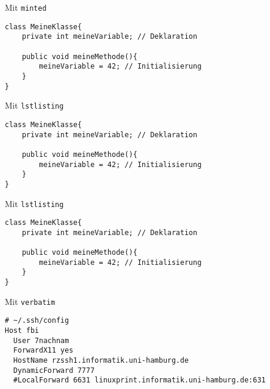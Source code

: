 \documentclass{beamer}
\begin{document}

		\begin{frame}[containsverbatim]{Mit \texttt{minted}}
			\begin{verbatim}
class MeineKlasse{
	private int meineVariable; // Deklaration

	public void meineMethode(){
		meineVariable = 42; // Initialisierung
	}
}
			\end{verbatim}
		\end{frame}


		\begin{frame}[containsverbatim]{Mit \texttt{lstlisting}}
			\begin{smallerlatexcode}
\usepackage{listings}
\lstset{...} %
\begin{lstlisting}[caption=Variablen]
class MeineKlasse{
	private int meineVariable; // Deklaration

	public void meineMethode(){
		meineVariable = 42; // Initialisierung
	}
}
\end{lstlisting}
			\end{smallerlatexcode}
		\end{frame}


		\begin{frame}[containsverbatim]{Mit \texttt{lstlisting}}
			\slideheading{Ergebnis:}
			\begin{lstlisting}[caption=Variablen]
class MeineKlasse{
	private int meineVariable; // Deklaration

	public void meineMethode(){
		meineVariable = 42; // Initialisierung
	}
}
			\end{lstlisting}
		\end{frame}

		
		\begin{frame}[containsverbatim]{Mit \texttt{verbatim}}
			\slideheading{\LaTeX-Code:}
			\begin{smallerlatexcode}
\begin{verbatim}
# ~/.ssh/config
Host fbi
  User 7nachnam
  ForwardX11 yes
  HostName rzssh1.informatik.uni-hamburg.de
  DynamicForward 7777
  #LocalForward 6631 linuxprint.informatik.uni-hamburg.de:631
\end{verbatim}
			\end{smallerlatexcode}
		\end{frame}
\end{document}
